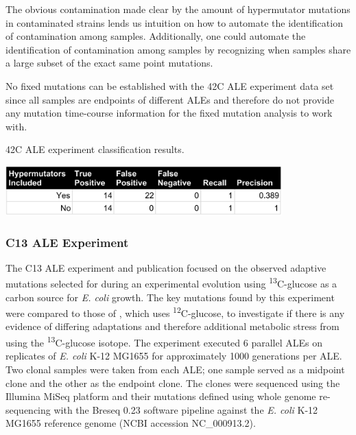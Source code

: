\documentclass[12pt,final,masters,chapterheads]{ucsd}  %
\begin{document}
The obvious contamination made clear by the amount of hypermutator mutations in contaminated strains lends us intuition on how to automate the identification of contamination among samples. Additionally, one could automate the identification of contamination among samples by  recognizing when samples share a large subset of the exact same point mutations.

No fixed mutations can be established with the 42C ALE experiment data set since all samples are endpoints of different ALEs and therefore do not provide any mutation time-course information for the fixed mutation analysis to work with.
\begin{table}[H]
  \centering
   \caption{42C ALE experiment classification results.}
  \includegraphics[width=0.8\textwidth]{42c_precision_recall.png}
\end{table}
\subsubsection{C13 ALE Experiment}
The C13 ALE experiment and publication focused on the observed adaptive mutations selected for during an experimental evolution using \textsuperscript{13}C-glucose as a carbon source for \textit{E. coli} growth. The key mutations found by this experiment were compared to those of \cite{pmid25304508}, which uses \textsuperscript{12}C-glucose, to investigate if there is any evidence of differing adaptations and therefore additional metabolic stress from using the \textsuperscript{13}C-glucose isotope. The experiment executed 6 parallel ALEs  on replicates of \textit{E. coli} K-12 MG1655 for approximately 1000 generations per ALE. Two clonal samples were taken from each ALE; one sample served as a midpoint clone and the other as the endpoint clone. The clones were sequenced using the Illumina MiSeq platform and their mutations defined using whole genome re-sequencing with the Breseq 0.23 software pipeline against the \textit{E. coli} K-12 MG1655 reference genome (NCBI accession NC\_000913.2).
\end{document}
